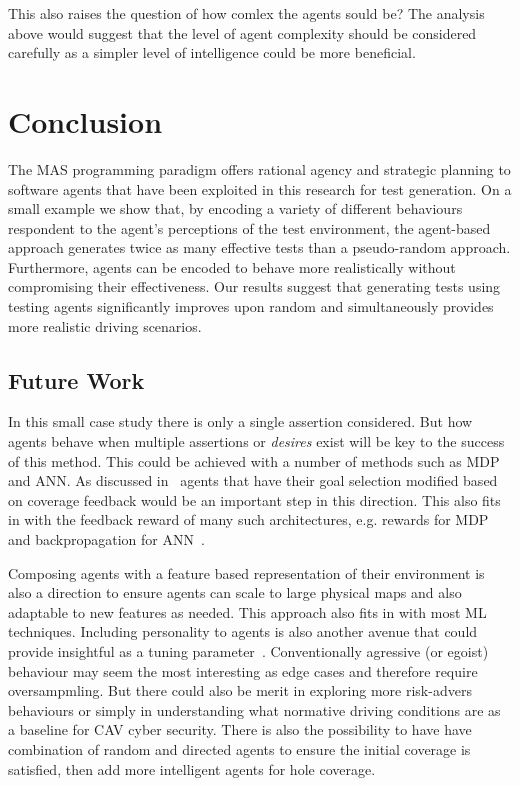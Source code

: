 \documentclass[letterpaper, 10 pt, journal, twoside]{IEEEtran}
\begin{document}
This also raises the question of how comlex the agents sould be? The analysis above would suggest that the level of agent complexity should be considered carefully as a simpler level of intelligence could be more beneficial. %





\section{Conclusion}
The MAS programming paradigm offers rational agency and strategic planning to software agents that have been exploited in this research for test generation. 
%
On a small example we show that, by encoding a variety of different behaviours respondent to the agent's perceptions of the test environment, the agent-based approach generates twice as many effective tests than a pseudo-random approach. Furthermore, agents can be encoded to behave more realistically without compromising their effectiveness. %
Our results suggest that generating tests using testing agents significantly improves upon random and simultaneously provides more realistic driving scenarios.



\subsection{Future Work} \label{future}
%
In this small case study there is only a single assertion considered. But how agents behave when multiple assertions or \textit{desires} exist will be key to the success of this method. This could be achieved with a number of methods such as MDP and ANN.
%
As discussed in~\cite{Eder2007} agents that have their goal selection modified based on coverage feedback would be an important step in this direction. This also fits in with the feedback reward of many such architectures, e.g. rewards for MDP~\cite{littman1994markov} and backpropagation for ANN~\cite{foerster2016learning}. 

Composing agents with a feature based representation of their environment is also a direction to ensure agents can scale to large physical maps and also adaptable to new features as needed. This approach also fits in with most ML techniques.
%
Including personality to agents is also another avenue that could provide insightful as a tuning parameter~\cite{Zoumpoulaki2010}. Conventionally agressive (or egoist) behaviour may seem the most interesting as edge cases and therefore require oversampmling. But there could also be merit in exploring more risk-advers behaviours or simply in understanding what normative driving conditions are as a baseline for CAV cyber security. 
%
There is also the possibility to have have combination of random and directed agents to ensure the initial coverage is satisfied, then add more intelligent agents for hole coverage.
\end{document}

